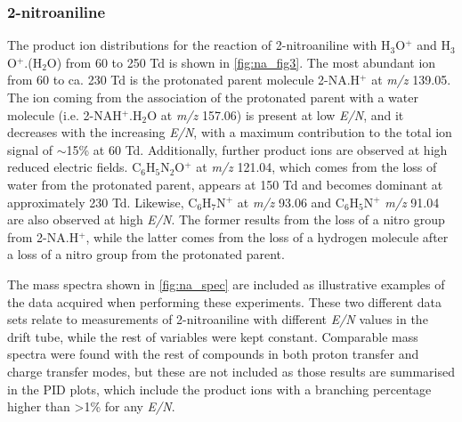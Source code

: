 \subsubsection{2-nitroaniline}
The product ion distributions for the reaction of 2-nitroaniline with H$_3$O$^+$ and H$_3$O$^+$.(H$_2$O) from 60 to 250 Td is shown in \autoref{fig:na_fig3}. 
The most abundant ion from 60 to ca. 230 Td is the protonated parent molecule 2-NA.H$^+$ at \textit{m/z} 139.05.
The ion coming from the association of the protonated parent with a water molecule (i.e. 2-NAH$^+$.H$_2$O at \textit{m/z} 157.06) is present at low \textit{E/N}, and it decreases with the increasing \textit{E/N}, with a maximum contribution to the total ion signal of $\sim$15\% at 60 Td.
Additionally, further product ions are observed at high reduced electric fields. 
C$_6$H$_5$N$_2$O$^+$ at \textit{m/z} 121.04, which comes from the loss of water from the protonated parent, appears at 150 Td and becomes dominant at approximately 230 Td.
Likewise, C$_6$H$_7$N$^+$ at \textit{m/z} 93.06 and C$_6$H$_5$N$^+$ \textit{m/z} 91.04 are also observed at high \textit{E/N}. 
The former results from the loss of a nitro group from 2-NA.H$^+$, while the latter comes from the loss of a hydrogen molecule after a loss of a nitro group from the protonated parent.

The mass spectra shown in \autoref{fig:na_spec} are included as illustrative examples of the data acquired when performing these experiments. 
These two different data sets relate to measurements of 2-nitroaniline with different \textit{E/N} values in the drift tube, while the rest of variables were kept constant. 
Comparable mass spectra were found with the rest of compounds in both proton transfer and charge transfer modes, but these are not included as those results are summarised in the PID plots, which include the product ions with a branching percentage higher than >1\% for any \textit{E/N}.


